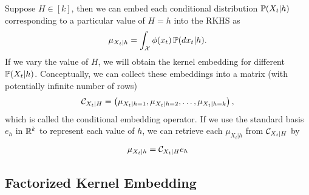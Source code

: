 \documentclass{article}
\begin{document}
Suppose $H\in[k]$, then we can embed each conditional distribution $\mathbb{P}(X_t|h)$ corresponding to a particular value of $H=h$ into the RKHS as
\begin{align}
  \mu_{X_t|h} = \int_{\mathcal{X}} \phi(x_t)\, \mathbb{P}(dx_t | h).
\end{align}
If we vary the value of $H$, we will obtain the kernel embedding for different $\mathbb{P}(X_t|h)$. Conceptually, we can collect these embeddings into a matrix (with potentially infinite number of rows)
\begin{align}
  \mathcal{C}_{X_t|H} = \left(\mu_{X_t|h=1},\mu_{X_t|h=2},\ldots,\mu_{X_t|h=k}\right),
\end{align}
which is called the conditional embedding operator. If we use the standard basis $e_h$ in $\mathbb{R}^k$ to represent each value of $h$, we can retrieve each $\mu_{X_t|h}$ from $\mathcal{C}_{X_t|H}$ by
\begin{align}
  \mu_{X_t|h} = \mathcal{C}_{X_t|H} e_h
\end{align}

\subsection{Factorized Kernel Embedding}
\end{document}

